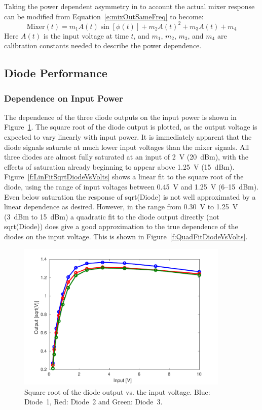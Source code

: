 Taking the power dependent asymmetry in to account the actual mixer response can be modified from Equation~\ref{e:mixOutSameFreq} to become:
\begin{equation}
\mathrm{Mixer}(t) = m_1A(t)\sin[\phi(t)] + m_2A(t)^2 + m_3A(t) + m_4
\label{e:actualMixerResponse}
\end{equation}
Here \(A(t)\) is the input voltage at time \(t\), and \(m_1\), \(m_2\), \(m_3\), and \(m_4\) are calibration constants needed to describe the power dependence.

\subsection{Diode Performance}
\label{ss:sigGenDiode}

\subsubsection{Dependence on Input Power}

The dependence of the three diode outputs on the input power is shown in Figure~\ref{f:SqrtDiodeVsVolts}. The square root of the diode output is plotted, as the output voltage is expected to vary linearly with input power. It is immediately apparent that the diode signals saturate at much lower input voltages than the mixer signals. All three diodes are almost fully saturated at an input of 2~V (20~dBm), with the effects of saturation already beginning to appear above 1.25~V (15~dBm). Figure~\ref{f:LinFitSqrtDiodeVsVolts} shows a linear fit to the square root of the diode, using the range of input voltages between 0.45~V and 1.25~V (6--15~dBm). Even below saturation the response of sqrt(Diode) is not well approximated by a linear dependence as desired. However, in the range from 0.30~V to 1.25~V (3~dBm to 15~dBm) a quadratic fit to the diode output directly (not sqrt(Diode)) does give a good approximation to the true dependence of the diodes on the input voltage. This is shown in Figure~\ref{f:QuadFitDiodeVsVolts}.

\begin{figure}
  \centering
  \includegraphics[width=0.9\textwidth]{Figures/phaseMons/SqrtDiodeVsVolts}
  \caption{Square root of the diode output vs. the input voltage. Blue: Diode~1, Red: Diode~2 and Green: Diode~3.}
  \label{f:SqrtDiodeVsVolts}
\end{figure}

